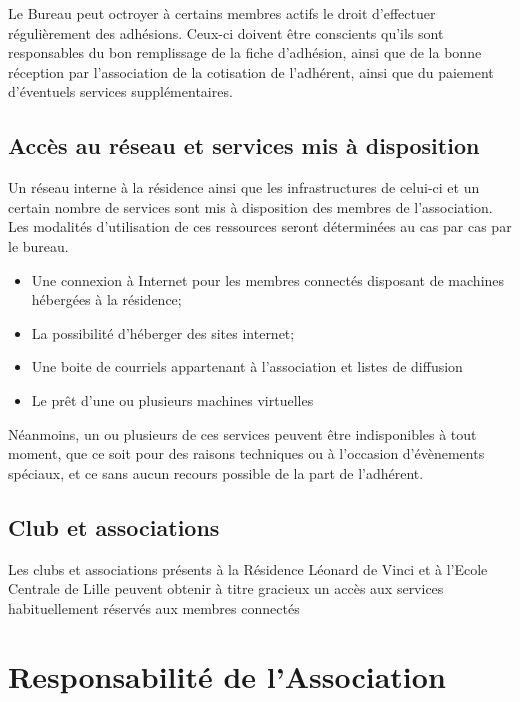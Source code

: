 \documentclass[12pt]{article}
\begin{document}
		Le Bureau peut octroyer à certains membres actifs le droit d’effectuer régulièrement des adhésions. Ceux-ci doivent être conscients qu’ils sont responsables du bon remplissage de la fiche d’adhésion, ainsi que de la bonne réception par l’association de la cotisation de l’adhérent, ainsi que du paiement d’éventuels services supplémentaires.

    \subsection{Accès au réseau et services mis à disposition}

		Un réseau interne à la résidence ainsi que les infrastructures de celui-ci et un certain nombre de services sont mis à disposition des membres de l'association. Les modalités d'utilisation de ces ressources seront déterminées au cas par cas par le bureau.

		\begin{itemize}
			 \item[\textbullet] Une connexion à Internet pour les membres connectés disposant de machines hébergées à la résidence;
			 \item[\textbullet] La possibilité d'héberger des sites internet;
			 \item[\textbullet] Une boite de courriels appartenant à l'association et listes de diffusion
			 \item[\textbullet] Le prêt d'une ou plusieurs machines virtuelles
		 \end{itemize}

		Néanmoins, un ou plusieurs de ces services peuvent être indisponibles à tout moment, que ce soit pour des raisons techniques ou à l'occasion d'évènements spéciaux, et ce sans aucun recours possible de la part de l'adhérent.

    \subsection{Club et associations}

		Les clubs et associations présents à la Résidence Léonard de Vinci et à l'Ecole Centrale de Lille peuvent obtenir à titre gracieux un accès aux services habituellement réservés aux membres connectés

\section{Responsabilité de l'Association}
\end{document}
